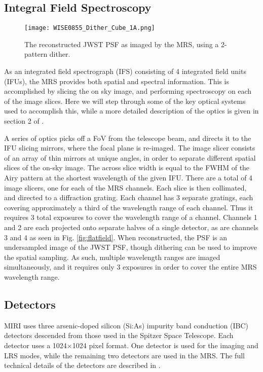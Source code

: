 \subsection{Integral Field Spectroscopy}
\begin{wrapfigure}{r}{5.5cm}
	\vspace{-1em}
	\texttt{[image: WISE0855\_Dither\_Cube\_1A.png]}
	\caption{The reconstructed JWST PSF as imaged by the MRS, using a 2-pattern dither.}
	\label{fig:miripsf}
\end{wrapfigure}
As an integrated field spectrograph (IFS) consisting of 4 integrated field units (IFUs), the MRS provides both spatial and spectral information.
This is accomplished by slicing the on sky image, and performing spectroscopy on each of the image slices. 
Here we will step through some of the key optical systems used to accomplish this, while a more detailed description of the optics is given in section 2 of \parencite{MIRI6}.

A series of optics picks off a FoV from the telescope beam, and directs it to the IFU slicing mirrors, where the focal plane is re-imaged. 
The image slicer consists of an array of thin mirrors at unique angles, in order to separate different spatial slices of the on-sky image.
The across slice width is equal to the FWHM of the Airy pattern at the shortest wavelength of the given IFU.
There are a total of 4 image slicers, one for each of the MRS channels.
Each slice is then collimated, and directed to a diffraction grating. 
Each channel has 3 separate gratings, each covering approximately a third of the wavelength range of each channel. 
Thus it requires 3 total exposures to cover the wavelength range of a channel.
Channels 1 and 2 are each projected onto separate halves of a single detector, as are channels 3 and 4 as seen in Fig. \ref{fig:flatfield}.
When reconstructed, the PSF is an undersampled image of the JWST PSF, though dithering can be used to improve the spatial sampling.
As such, multiple wavelength ranges are imaged simultaneously, and it requires only 3 exposures in order to cover the entire MRS wavelength range. 
\subsection{Detectors}
MIRI uses three arsenic-doped silicon (Si:As) impurity band conduction (IBC) detectors descended from those used in the Spitzer Space Telescope.
Each detector uses a 1024$\times$1024 pixel format.
One detector is used for the imaging and LRS modes, while the remaining two detectors are used in the MRS.
The full technical details of the detectors are described in \parencite{MIRI7}.

